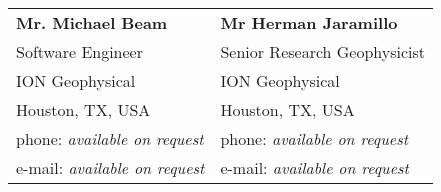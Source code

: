 \documentclass[line,margin]{res}
\begin{document}
\begin{resume}
\begin{tabular}{@{}p{6cm}p{6cm}}
\textbf{Mr. Michael Beam}               &  \textbf{Mr Herman Jaramillo}             \\
Software Engineer                       &  Senior Research Geophysicist             \\
ION Geophysical                         &  ION Geophysical                          \\
Houston, TX, USA                        &  Houston, TX, USA                         \\
phone: \textsl{available on request}    &  phone: \textsl{available on request}     \\
e-mail: \textsl{available on request}   &  e-mail: \textsl{available on request}    \\
\end{tabular}


\end{resume}
\end{document}
